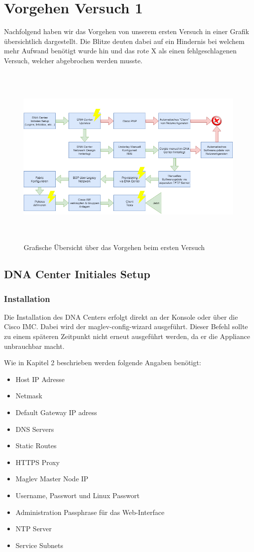 \section{Vorgehen Versuch 1} \label{versuch1}
Nachfolgend haben wir das Vorgehen von unserem ersten Versuch in einer Grafik übersichtlich dargestellt. Die Blitze deuten dabei auf ein Hindernis bei welchem mehr Aufwand benötigt wurde hin und das rote X als einen fehlgeschlagenen Versuch, welcher abgebrochen werden musste.
\begin{figure}[H]
	\centering
	\includegraphics[height=9cm]{img/vorgehen.png}
	\caption{Grafische Übersicht über das Vorgehen beim ersten Versuch}
	\label{fig:vorgehen}
\end{figure} 

\subsection{DNA Center Initiales Setup}

\subsubsection{Installation}
\label{DNACenterSetup_Installation}
Die Installation des DNA Centers erfolgt direkt an der Konsole oder über die Cisco IMC. Dabei wird der maglev-config-wizard ausgeführt. Dieser Befehl sollte zu einem späteren Zeitpunkt nicht erneut ausgeführt werden, da er die Appliance unbrauchbar macht. 

Wie in Kapitel 2\cite{cisco-dna-installation-guide} beschrieben werden folgende Angaben benötigt:
\begin{itemize}
	\item Host IP Adresse
	\item Netmask
	\item Default Gateway IP adress
	\item DNS Servers
	\item Static Routes
	\item HTTPS Proxy
	\item Maglev Master Node IP
	\item Username, Passwort und Linux Passwort
	\item Administration Passphrase für das Web-Interface
	\item NTP Server
	\item Service Subnets
\end{itemize}

